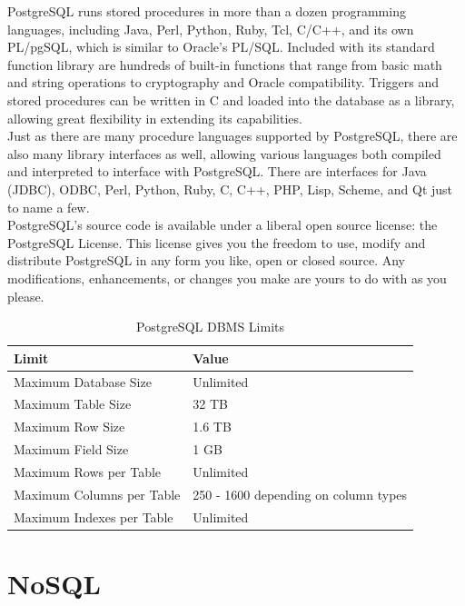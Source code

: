PostgreSQL runs stored procedures in more than a dozen programming languages, including Java, Perl, Python, Ruby, Tcl, C/C++, and its own PL/pgSQL, which is similar to Oracle's PL/SQL. Included with its standard function library are hundreds of built-in functions that range from basic math and string operations to cryptography and Oracle compatibility. Triggers and stored procedures can be written in C and loaded into the database as a library, allowing great flexibility in extending its capabilities.\\

Just as there are many procedure languages supported by PostgreSQL, there are also many library interfaces as well, allowing various languages both compiled and interpreted to interface with PostgreSQL. There are interfaces for Java (JDBC), ODBC, Perl, Python, Ruby, C, C++, PHP, Lisp, Scheme, and Qt just to name a few.\\

PostgreSQL's source code is available under a liberal open source license: the PostgreSQL License. This license gives you the freedom to use, modify and distribute PostgreSQL in any form you like, open or closed source. Any modifications, enhancements, or changes you make are yours to do with as you please.\\

\begin{table}
\begin{center}
\begin{tabular}{|l|l|}
\hline \textbf{Limit} & \textbf{Value}\\ \hline
Maximum Database Size & Unlimited\\
Maximum Table Size & 32 TB\\
Maximum Row Size & 1.6 TB\\
Maximum Field Size & 1 GB\\
Maximum Rows per Table & Unlimited\\
Maximum Columns per Table & 250 - 1600 depending on column types\\
Maximum Indexes per Table & Unlimited\\ \hline
\end{tabular}
\end{center}
\caption{PostgreSQL DBMS Limits}
\end{table}


\section{NoSQL}

